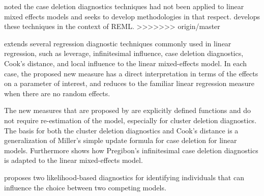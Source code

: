 \documentclass[12pt, a4paper]{report}
\theoremstyle{plain}
\theoremstyle{definition}
\theoremstyle{remark}
\begin{document}
\citet{CPJ} noted the case deletion diagnostics techniques had not been applied to linear mixed effects models and seeks to develop methodologies in that respect. \citet{CPJ} develops these techniques in the context of REML.
>>>>>>> origin/master



\citet{Demi} extends several regression diagnostic techniques commonly used in linear regression, such as leverage, infinitesimal influence, case deletion diagnostics, Cook's distance, and local influence to the linear mixed-effects model. In each case, the proposed new measure has a direct interpretation in terms of the effects on a parameter of interest, and reduces to the familiar linear regression measure when there are no random effects. 

The new measures that are proposed by \citet{Demi} are explicitly defined functions and do not require re-estimation of the model, especially for cluster deletion diagnostics. The basis for both the cluster deletion diagnostics and Cook's distance is a generalization of Miller's simple update formula for case deletion for linear models. Furthermore \citet{Demi} shows how Pregibon's infinitesimal case deletion diagnostics is adapted to the linear mixed-effects model. 


%
%
%

\citet{Demi} proposes two likelihood-based diagnostics for identifying individuals that can influence the choice between two competing models.
\end{document}
